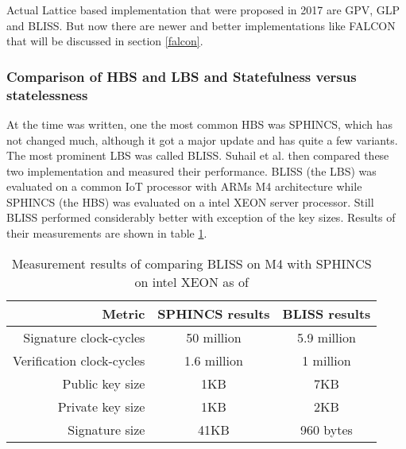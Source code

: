 \documentclass[conference]{IEEEtran}
\begin{document}
Actual Lattice based implementation that were proposed in 2017 are GPV, GLP and BLISS. But now there are newer and better implementations like FALCON that will be discussed in section \ref{falcon}.

\subsubsection{Comparison of HBS and LBS and Statefulness versus statelessness}
At the time \cite{QR_sigs} was written, one the most common HBS was SPHINCS, which has not changed much, although it got a major update and has quite a few variants.
The most prominent LBS was called BLISS.
Suhail et al. then compared these two implementation and measured their performance.
BLISS (the LBS) was evaluated on a common IoT processor with ARMs M4 architecture while SPHINCS (the HBS) was evaluated on a intel XEON server processor. Still BLISS performed considerably better with exception of the key sizes. Results of their measurements are shown in table \ref{t:sphincsVSbliss}.

\begin{table}[]
    \centering
    \caption{Measurement results of comparing BLISS on M4 with SPHINCS on intel XEON as of \cite{QR_sigs}}
    \label{t:sphincsVSbliss}
    \begin{tabular}{|r | c  c|}
        \hline
        Metric & SPHINCS results & BLISS results\\
        \hline
        Signature clock-cycles & 50 million & 5.9 million \\
        Verification clock-cycles & 1.6 million & 1 million \\
        Public key size & 1KB & 7KB \\
        Private key size & 1KB & 2KB \\
        Signature size & 41KB & 960 bytes \\
        \hline
    \end{tabular}
\end{table}
\end{document}
